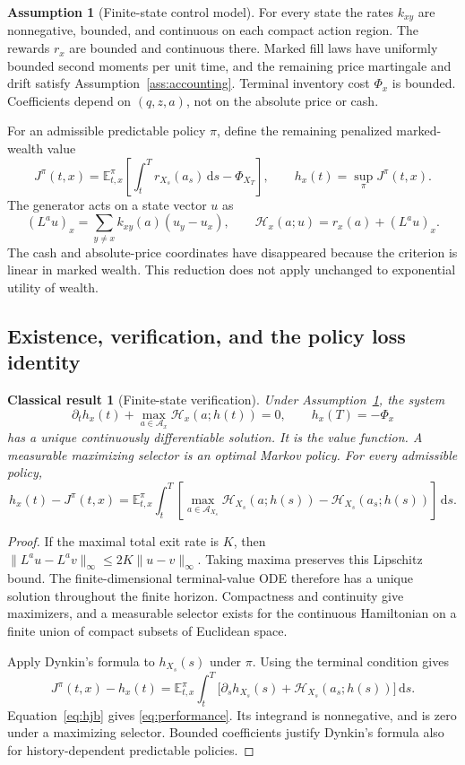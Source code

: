 \documentclass[11pt]{article}
\theoremstyle{plain}
\newtheorem{classical}[theorem]{Classical result}
\theoremstyle{definition}
\newtheorem{assumption}[theorem]{Assumption}
\theoremstyle{remark}
\newcommand{\E}{\mathbb E}
\newcommand{\dd}{\,\mathrm d}
\newcommand{\norm}[1]{\lVert#1\rVert}
\newcommand{\HH}{\mathcal H}
\newcommand{\cAct}{\mathcal A}
\begin{document}
\begin{assumption}[Finite-state control model]\label{ass:finite}
For every state the rates \(k_{xy}\) are nonnegative, bounded, and
continuous on each compact action region. The rewards \(r_x\) are
bounded and continuous there. Marked fill laws have uniformly bounded
second moments per unit time, and the remaining price martingale and drift
satisfy Assumption~\ref{ass:accounting}. Terminal inventory cost
\(\Phi_x\) is bounded. Coefficients depend on \((q,z,a)\), not on the
absolute price or cash.
\end{assumption}

For an admissible predictable policy \(\pi\), define the remaining
penalized marked-wealth value
\[
J^\pi(t,x)=
\E^\pi_{t,x}\left[\int_t^T r_{X_s}(a_s)\dd s-\Phi_{X_T}\right],
\qquad h_x(t)=\sup_\pi J^\pi(t,x).
\]
The generator acts on a state vector \(u\) as
\[
(L^a u)_x=\sum_{y\ne x}k_{xy}(a)(u_y-u_x),
\qquad
\HH_x(a;u)=r_x(a)+(L^a u)_x.
\]
The cash and absolute-price coordinates have disappeared because the
criterion is linear in marked wealth. This reduction does not apply
unchanged to exponential utility of wealth.

\subsection{Existence, verification, and the policy loss identity}

\begin{classical}[Finite-state verification]\label{thm:verification}
Under Assumption~\ref{ass:finite}, the system
\begin{equation}\label{eq:hjb}
\partial_t h_x(t)+\max_{a\in\cAct_x}\HH_x(a;h(t))=0,
\qquad h_x(T)=-\Phi_x
\end{equation}
has a unique continuously differentiable solution. It is the value
function. A measurable maximizing selector is an optimal Markov policy.
For every admissible policy,
\begin{equation}\label{eq:performance}
h_x(t)-J^\pi(t,x)=
\E^\pi_{t,x}\int_t^T
\left[\max_{a\in\cAct_{X_s}}\HH_{X_s}(a;h(s))
             -\HH_{X_s}(a_s;h(s))\right]\dd s .
\end{equation}
\end{classical}
\begin{proof}
If the maximal total exit rate is \(K\), then
\(\norm{L^a u-L^a v}_\infty\le2K\norm{u-v}_\infty\).
Taking maxima preserves this Lipschitz bound. The finite-dimensional
terminal-value ODE therefore has a unique solution throughout the
finite horizon. Compactness and continuity give maximizers, and a
measurable selector exists for the continuous Hamiltonian on a finite
union of compact subsets of Euclidean space.

Apply Dynkin's formula to \(h_{X_s}(s)\) under \(\pi\).
Using the terminal condition gives
\[
J^\pi(t,x)-h_x(t)
=\E^\pi_{t,x}\int_t^T
\big[\partial_s h_{X_s}(s)+\HH_{X_s}(a_s;h(s))\big]\dd s.
\]
Equation~\eqref{eq:hjb} gives \eqref{eq:performance}. Its integrand is
nonnegative, and is zero under a maximizing selector. Bounded
coefficients justify Dynkin's formula also for history-dependent
predictable policies.
\end{proof}
\end{document}
